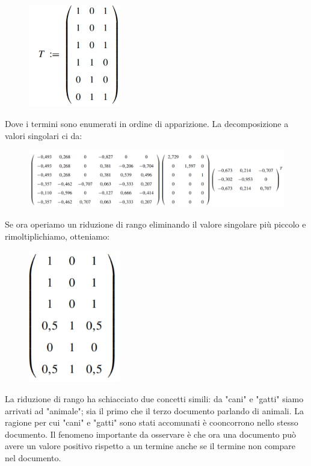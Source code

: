\documentclass[12pt,italian]{report}
\begin{document}
\begin{figure}[h]
	\centering
	\includegraphics[width=40mm]{image/semantica1.png}
	\label{fig:ef1}
\end{figure}
Dove i termini sono enumerati in ordine di apparizione. La decomposizione a valori singolari ci da: 

\begin{figure}[h]
	\centering
	\includegraphics[width=130mm]{image/semantica2.png}
	\label{fig:ef1}
\end{figure}
Se ora operiamo un riduzione di rango eliminando il valore singolare più piccolo e rimoltiplichiamo, otteniamo:

\begin{figure}[h]
	\centering
	\includegraphics[width=40mm]{image/semantica3.png}
	\label{fig:ef1}
\end{figure}

La riduzione di rango ha schiacciato due concetti simili: da "cani" e "gatti" siamo arrivati ad "animale"; sia il primo che il terzo documento parlando di animali. La ragione per cui "cani" e "gatti" sono stati accomunati è cooncorrono nello stesso documento. Il fenomeno importante da osservare è che ora una documento può avere un valore positivo rispetto a un termine anche se il termine non compare nel documento. 
\end{document}

